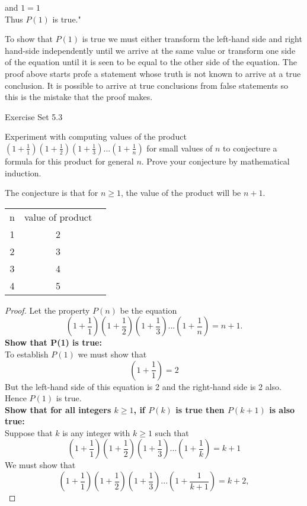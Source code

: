 \documentclass[12pt,letterpaper, onecolumn]{exam}
\begin{document}
\begin{questions}
		and $1=1$\\
		Thus $P(1)$ is true."\\
		\begin{solution}
			To show that $P(1)$ is true we must either transform the left-hand side and right hand-side independently until we arrive at the same value or transform one side of the equation until it is seen to be equal to the other side of the equation. The proof above starts profe a statement whose truth is not known to arrive at a true conclusion. It is possible to arrive at true conclusions from false statements so this is the mistake that the proof makes.
		\end{solution}
			\end{questions}
		\pagebreak
		\centering\large Exercise Set 5.3\\
		\begin{questions}
		 \setcounter{question}{1}\question Experiment with computing values of the product $(1+\frac{1}{1})(1+\frac{1}{2})(1+\frac{1}{3})...(1+\frac{1}{n})$ for small values of $n$ to conjecture a formula for this product for general $n$. Prove your conjecture by mathematical induction.
		 \begin{solution}
		 	The conjecture is that for $n\geq1$, the value of the product will be $n+1$.\\
		 	\begin{tabular}{c c c}
		 		n&value of product\\
		 		1&2\\
		 		2&3\\
		 		3&4\\
		 		4&5\\
		 	\end{tabular}
		 		\begin{proof}
		 		Let the property $P(n)$ be the equation
		 		$$(1+\frac{1}{1})(1+\frac{1}{2})(1+\frac{1}{3})...(1+\frac{1}{n})=n+1.$$
		 		\textbf{Show that P(1) is true:}\\
		 		To establish $P(1)$ we must show that
		 		$$(1+\frac{1}{1})=2$$
		 		But the left-hand side of this equation is 2 and the right-hand side is 2
		 		also. Hence $P(1)$ is true.\\
		 		\textbf{Show that for all integers $k\geq1$, if $P(k)$ is true then $P(k+1)$ is also true:}\\
		 		Suppose that $k$ is any integer with $k\geq1$ such that
		 		$$(1+\frac{1}{1})(1+\frac{1}{2})(1+\frac{1}{3})...(1+\frac{1}{k})=k+1$$
		 		We must show that
		 		$$(1+\frac{1}{1})(1+\frac{1}{2})(1+\frac{1}{3})...(1+\frac{1}{k+1})=k+2,$$

\end{proof}
\end{solution}
\end{questions}
\end{document}
